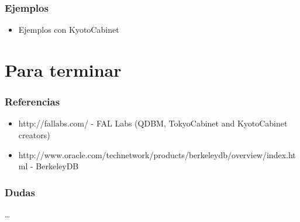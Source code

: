 \documentclass[10pt]{beamer}
\begin{document}
  \begin{frame}
    \frametitle{Ejemplos}
    \begin{itemize}
      \item Ejemplos con KyotoCabinet
    \end{itemize}
  \end{frame}

  \section*{Para terminar}

  \begin{frame}
    \frametitle{Referencias}
    \begin{itemize}
      \item \small{http://fallabs.com/ - FAL Labs (QDBM, TokyoCabinet and KyotoCabinet creators)}
      \item \small{http://www.oracle.com/technetwork/products/berkeleydb/overview/index.html - BerkeleyDB}
    \end{itemize}
  \end{frame}

  \begin{frame}
    \frametitle{Dudas}
    \dots
  \end{frame}
\end{document}
